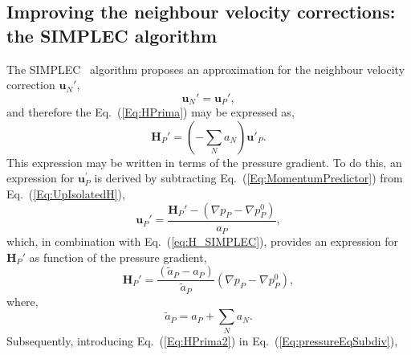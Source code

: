 \documentclass[final,3p,times,11pt,onecolumn]{myElsarticle}
\numberwithin{equation}{section}
\begin{document}

\subsection{Improving the neighbour velocity corrections: the SIMPLEC algorithm}
The SIMPLEC~\cite{vanDoormal} algorithm proposes an approximation for the neighbour velocity correction $\boldsymbol{u}_N'$,
\begin{equation}
\label{Eq:simplecAproximation}
\boldsymbol{u}_N'
=
\boldsymbol{u}_P',
\end{equation}
and therefore the Eq.~(\ref{Eq:HPrima}) may be expressed as,
\begin{equation}
\label{eq:H_SIMPLEC}
\boldsymbol{H}_P'= \left(-\sum_N a_N\right) \boldsymbol{u}'_P.
\end{equation}
This expression may be written in terms of the pressure gradient. To do this, an expression for $\boldsymbol{u}_P^{'}$ is derived by subtracting Eq.~(\ref{Eq:MomentumPredictor}) from Eq.~(\ref{Eq:UpIsolatedH}),
\begin{equation}
\label{Eq:UPrimaIsolated}
\boldsymbol{u}_P'
=
\dfrac
{
\boldsymbol{H}_P'
- 
\left(
\nabla p_P
-
\nabla p_P^{0}
\right)
}
{a_P},
\end{equation}
which, in combination with Eq.~(\ref{eq:H_SIMPLEC}), provides an expression for $\boldsymbol{H}_P'$ as function of the pressure gradient,
\begin{equation}
\label{Eq:HPrima2}
\boldsymbol{H}_P'
= 
\dfrac
{
\left(
\tilde{a}_P
-
a_P
\right)
}
{
\tilde{a}_P
}
\left(
\nabla p_P
-
\nabla p_P^{0}
\right),
\end{equation}
where,
\begin{equation}
\tilde{a}_P
=
a_P + \sum_{N} a_{N}.
\end{equation}
Subsequently, introducing Eq.~(\ref{Eq:HPrima2}) in Eq.~(\ref{Eq:pressureEqSubdiv}),
\end{document}
